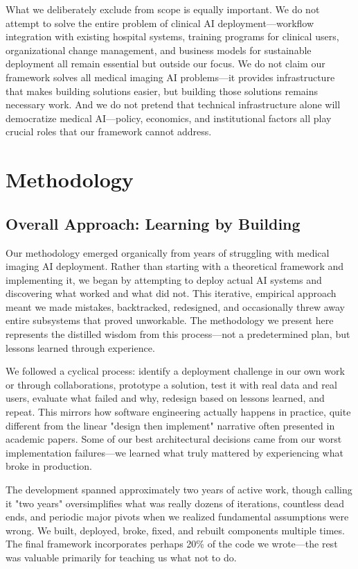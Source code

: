 \documentclass[12pt,a4paper]{article}
\begin{document}
What we deliberately exclude from scope is equally important. We do not attempt to solve the entire problem of clinical AI deployment—workflow integration with existing hospital systems, training programs for clinical users, organizational change management, and business models for sustainable deployment all remain essential but outside our focus. We do not claim our framework solves all medical imaging AI problems—it provides infrastructure that makes building solutions easier, but building those solutions remains necessary work. And we do not pretend that technical infrastructure alone will democratize medical AI—policy, economics, and institutional factors all play crucial roles that our framework cannot address.

\section{Methodology}

\subsection{Overall Approach: Learning by Building}

Our methodology emerged organically from years of struggling with medical imaging AI deployment. Rather than starting with a theoretical framework and implementing it, we began by attempting to deploy actual AI systems and discovering what worked and what did not. This iterative, empirical approach meant we made mistakes, backtracked, redesigned, and occasionally threw away entire subsystems that proved unworkable. The methodology we present here represents the distilled wisdom from this process—not a predetermined plan, but lessons learned through experience.

We followed a cyclical process: identify a deployment challenge in our own work or through collaborations, prototype a solution, test it with real data and real users, evaluate what failed and why, redesign based on lessons learned, and repeat. This mirrors how software engineering actually happens in practice, quite different from the linear "design then implement" narrative often presented in academic papers. Some of our best architectural decisions came from our worst implementation failures—we learned what truly mattered by experiencing what broke in production.

The development spanned approximately two years of active work, though calling it "two years" oversimplifies what was really dozens of iterations, countless dead ends, and periodic major pivots when we realized fundamental assumptions were wrong. We built, deployed, broke, fixed, and rebuilt components multiple times. The final framework incorporates perhaps 20\% of the code we wrote—the rest was valuable primarily for teaching us what not to do.
\end{document}
